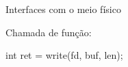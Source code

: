 \begin{frame}{\insertlecture}{Interfaces com o meio físico}

Chamada de função:
\begin{tt}
  int ret = write(fd, buf, len);\bigskip
\end{tt}





\end{frame}
